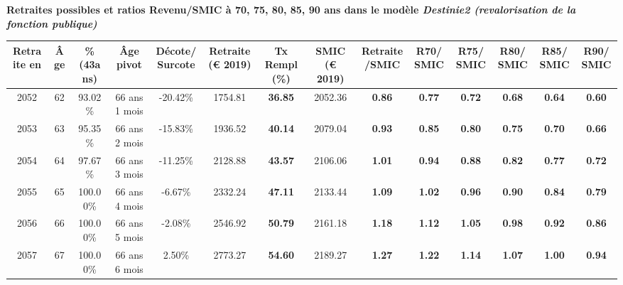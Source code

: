  \vspace{0.1cm} 
{\bf \noindent Retraites possibles et ratios Revenu/SMIC à 70, 75, 80, 85, 90 ans dans le modèle \emph{Destinie2 (revalorisation de la fonction publique)}}  
 
\begin{adjustbox}{max width=\textwidth} 
\begin{tabular}[htb]{|c|c||c|c|c||c|c||c|c||c|c|c|c|c|} 
\hline 
 Retraite en &  Âge &  \%(43ans) &  Âge pivot &  Décote/Surcote &  Retraite (\euro{} 2019) &  Tx Rempl(\%) &  SMIC (\euro{} 2019) &  Retraite/SMIC &  R70/SMIC &  R75/SMIC &  R80/SMIC &  R85/SMIC &  R90/SMIC \\ 
\hline \hline 
 2052 &  62 &  93.02\% &  66 ans 1 mois &  -20.42\% &  1754.81 &  {\bf 36.85} &  2052.36 &  {\bf {\color{red} 0.86}} &  {\bf {\color{red} 0.77}} &  {\bf {\color{red} 0.72}} &  {\bf {\color{red} 0.68}} &  {\bf {\color{red} 0.64}} &  {\bf {\color{red} 0.60}} \\ 
\hline 
 2053 &  63 &  95.35\% &  66 ans 2 mois &  -15.83\% &  1936.52 &  {\bf 40.14} &  2079.04 &  {\bf {\color{red} 0.93}} &  {\bf {\color{red} 0.85}} &  {\bf {\color{red} 0.80}} &  {\bf {\color{red} 0.75}} &  {\bf {\color{red} 0.70}} &  {\bf {\color{red} 0.66}} \\ 
\hline 
 2054 &  64 &  97.67\% &  66 ans 3 mois &  -11.25\% &  2128.88 &  {\bf 43.57} &  2106.06 &  {\bf 1.01} &  {\bf {\color{red} 0.94}} &  {\bf {\color{red} 0.88}} &  {\bf {\color{red} 0.82}} &  {\bf {\color{red} 0.77}} &  {\bf {\color{red} 0.72}} \\ 
\hline 
 2055 &  65 &  100.00\% &  66 ans 4 mois &  -6.67\% &  2332.24 &  {\bf 47.11} &  2133.44 &  {\bf 1.09} &  {\bf 1.02} &  {\bf {\color{red} 0.96}} &  {\bf {\color{red} 0.90}} &  {\bf {\color{red} 0.84}} &  {\bf {\color{red} 0.79}} \\ 
\hline 
 2056 &  66 &  100.00\% &  66 ans 5 mois &  -2.08\% &  2546.92 &  {\bf 50.79} &  2161.18 &  {\bf 1.18} &  {\bf 1.12} &  {\bf 1.05} &  {\bf {\color{red} 0.98}} &  {\bf {\color{red} 0.92}} &  {\bf {\color{red} 0.86}} \\ 
\hline 
 2057 &  67 &  100.00\% &  66 ans 6 mois &  2.50\% &  2773.27 &  {\bf 54.60} &  2189.27 &  {\bf 1.27} &  {\bf 1.22} &  {\bf 1.14} &  {\bf 1.07} &  {\bf 1.00} &  {\bf {\color{red} 0.94}} \\ 
\hline 
\hline 
\end{tabular} 
\end{adjustbox} 
 
 \vspace{0.1cm} 


